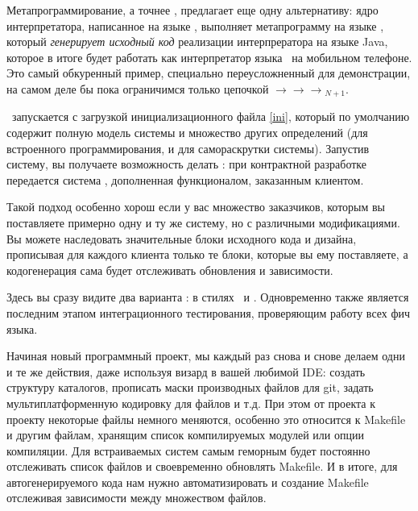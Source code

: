 \bigskip
Метапрограммирование, а точнее , предлагает еще одну
альтернативу: ядро интерпретатора, написанное на языке \py, выполняет
метапрограмму на языке \metal, который \emph{генерирует исходный код} реализации
интерпрератора на языке Java, которое в итоге будет работать как интерпретатор языка \F\ на
мобильном телефоне. Это самый обкуренный пример, специально переусложненный
для демонстрации, на самом деле бы пока ограничимся только цепочкой
\py$\rightarrow$\metal$\rightarrow$\py$\rightarrow$\metal$_{N+1}$.


\metal\ запускается с загрузкой инициализационного файла 
\ref{ini}, который по умолчанию содержит полную модель системы и множество
других определений (для встроенного программирования, и для самораскрутки
системы). Запустив систему, вы получаете возможность делать : при контрактной разработке передается система \metal,
дополненная функционалом, заказанным клиентом.

Такой подход особенно хорош если у вас множество заказчиков, которым вы
поставляете примерно одну и ту же систему, но с различными модификациями. Вы
можете наследовать значительные блоки исходного кода и дизайна,
прописывая для каждого клиента только те блоки, которые вы ему поставляете, а
кодогенерация сама будет отслеживать обновления и зависимости.

\clearpage
{}
Здесь вы сразу видите два варианта : в стилях \py\ и
\F. Одновременно  также является последним этапом
интеграционного тестирования, проверяющим работу всех фич языка.

\label{circfiles}


Начиная новый программный проект, мы каждый раз снова и снове делаем одни и те
же действия, даже используя визард в вашей любимой IDE: создать структуру
каталогов, прописать маски производных файлов для git, задать
мультиплатформенную кодировку для файлов и т.д. При этом от проекта к проекту
некоторые файлы немного меняются, особенно это относится к Makefile и другим
файлам, хранящим список компилируемых модулей или опции компиляции.
Для встраиваемых систем самым геморным будет постоянно отслеживать список файлов
и своевременно обновлять Makefile. И в итоге, для
автогенерируемого кода нам нужно автоматизировать и создание Makefile отслеживая
зависимости между множеством файлов.

\secup